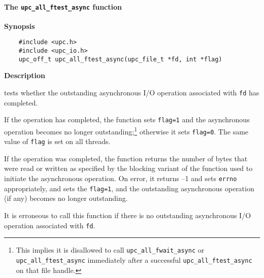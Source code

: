 \paragraph{The {\tt upc\_all\_ftest\_async} function}

{\bf Synopsis}

\npf\vspace{-2.5em} 

\begin{verbatim}
    #include <upc.h>
    #include <upc_io.h>
    upc_off_t upc_all_ftest_async(upc_file_t *fd, int *flag)
\end{verbatim}

{\bf Description}

 tests whether the outstanding asynchronous I/O
operation associated with {\tt fd} has completed.

\np If the operation has completed, the function sets {\tt flag=1} and the
asynchronous operation becomes no longer outstanding;\footnote{%
This implies it is disallowed to call {\tt upc\_all\_fwait\_async} or
{\tt upc\_all\_ftest\_async} immediately after a successful {\tt upc\_all\_ftest\_async}
on that file handle.} otherwise it sets {\tt flag=0}. The same value of {\tt flag} is
set on all threads.

\np If the operation was completed, the function returns the number of bytes
that were read or written as specified by the blocking variant of the
function used to initiate the asynchronous operation. On error, it returns
--1 and sets {\tt errno} appropriately, and sets the {\tt flag=1}, and the outstanding
asynchronous operation (if any) becomes no longer outstanding.

\np It is erroneous to call this function if there is no outstanding
asynchronous I/O operation associated with {\tt fd}.

